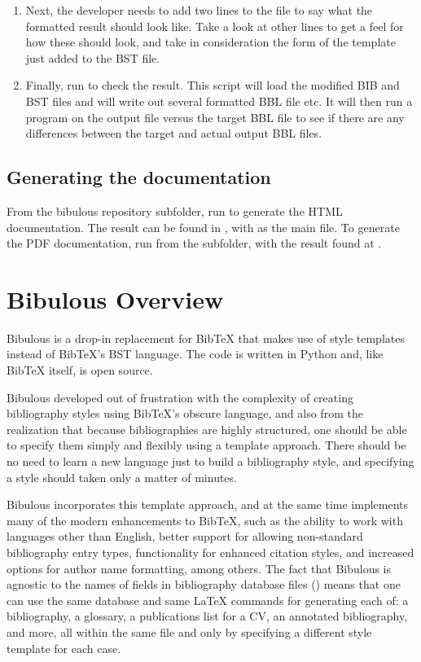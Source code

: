 \documentclass[letterpaper,10pt,english]{sphinxmanual}
\begin{document}
\begin{enumerate}
\item {} 
Next, the developer needs to add two lines to the  file to say what the formatted result should look like. Take a look at other lines to get a feel for how these should look, and take in consideration the form of the template just added to the BST file.

\item {} 
Finally, run  to check the result. This script will load the modified BIB and BST files and will write out several formatted BBL file  etc. It will then run a  program on the output file versus the target BBL file to see if there are any differences between the target and actual output BBL files.

\end{enumerate}


\section{Generating the documentation}
\label{developer_guide:generating-the-documentation}
From the bibulous repository  subfolder, run  to generate the HTML documentation. The result can be found in , with  as the main file. To generate the PDF documentation, run  from the  subfolder, with the result found at .


\chapter{Bibulous Overview}
\label{index:bibulous-overview}
Bibulous is a drop-in replacement for BibTeX that makes use of style templates instead of BibTeX's BST language. The code is written in Python and, like BibTeX itself, is open source.

Bibulous developed out of frustration with the complexity of creating bibliography styles using BibTeX's obscure language, and also from the realization that because bibliographies are highly structured, one should be able to specify them simply and flexibly using a template approach. There should be no need to learn a new language just to build a bibliography style, and specifying a style should taken only a matter of minutes.

Bibulous incorporates this template approach, and at the same time implements many of the modern enhancements to BibTeX, such as the ability to work with languages other than English, better support for allowing non-standard bibliography entry types, functionality for enhanced citation styles, and increased options for author name formatting, among others. The fact that Bibulous is agnostic to the names of fields in bibliography database files () means that one can use the same database and same LaTeX commands for generating each of: a bibliography, a glossary, a publications list for a CV, an annotated bibliography, and more, all within the same file and only by specifying a different style template for each case.
\end{document}
